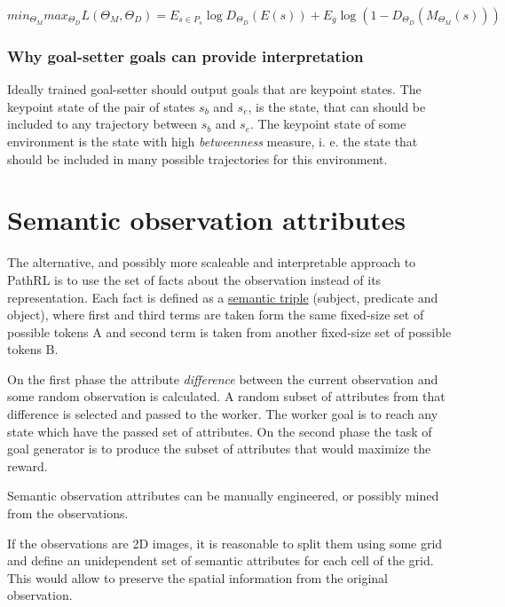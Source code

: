 \documentclass[acmsmall, nonacm]{acmart}
\begin{document}
\begin{equation} \label{eq-disc-loss}
min_{\Theta_M} max_{\Theta_D} L(\Theta_M, \Theta_D) = E_{s \in P_s} \log D_{\Theta_D}(E(s)) + E_g \log(1 - D_{\Theta_D}(M_{\Theta_M}(s)))
\end{equation}

\subsubsection{Why goal-setter goals can provide interpretation}

Ideally trained goal-setter should output goals that are keypoint states. The keypoint state of the pair of states $s_b$ and $s_e$, is the state, that can should be included to any trajectory between $s_b$ and $s_e$. The keypoint state of some environment is the state with high \emph{betweenness} measure, i. e. the state that should be included in many possible trajectories for this environment.

\section{Semantic observation attributes}

The alternative, and possibly more scaleable and interpretable approach to PathRL is to use the set of facts about the observation instead of its representation. Each fact is defined as a \href{https://en.wikipedia.org/wiki/Semantic_triple}{semantic triple} (subject, predicate and object), where first and third terms are taken form the same fixed-size set of possible tokens A and second term is taken from another fixed-size set of possible tokens B.

On the first phase the attribute \textit{difference} between the current observation and some random observation is calculated. A random subset of attributes from that difference is selected and passed to the worker. The worker goal is to reach any state which have the passed set of attributes. On the second phase the task of goal generator is to produce the subset of attributes that would maximize the reward.

Semantic observation attributes can be manually engineered, or possibly mined from the observations.

If the observations are 2D images, it is reasonable to split them using some grid and define an unidependent set of semantic attributes for each cell of the grid. This would allow to preserve the spatial information from the original observation.
\end{document}
